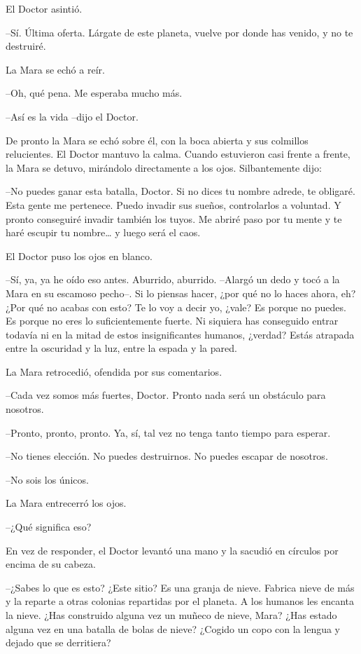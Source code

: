 El Doctor asintió.

--Sí. Última oferta. Lárgate de este planeta, vuelve por donde has venido, y no te destruiré.

La Mara se echó a reír.

--Oh, qué pena. Me esperaba mucho más.

--Así es la vida --dijo el Doctor.

De pronto la Mara se echó sobre él, con la boca abierta y sus colmillos relucientes. El Doctor mantuvo la calma. Cuando estuvieron casi frente a frente, la Mara se detuvo, mirándolo directamente a los ojos. Silbantemente dijo:

--No puedes ganar esta batalla, Doctor. Si no dices tu nombre adrede, te obligaré. Esta gente me pertenece. Puedo invadir sus sueños, controlarlos a voluntad. Y pronto conseguiré invadir también los tuyos. Me abriré paso por tu mente y te haré escupir tu nombre… y luego será el caos.

El Doctor puso los ojos en blanco.

--Sí, ya, ya he oído eso antes. Aburrido, aburrido. --Alargó un dedo y tocó a la Mara en su escamoso pecho--. Si lo piensas hacer, ¿por qué no lo haces ahora, eh? ¿Por qué no acabas con esto? Te lo voy a decir yo, ¿vale? Es porque no puedes. Es porque no eres lo suficientemente fuerte. Ni siquiera has conseguido entrar todavía ni en la mitad de estos insignificantes humanos, ¿verdad? Estás atrapada entre la oscuridad y la luz, entre la espada y la pared.

La Mara retrocedió, ofendida por sus comentarios.

--Cada vez somos más fuertes, Doctor. Pronto nada será un obstáculo para nosotros.

--Pronto, pronto, pronto. Ya, sí, tal vez no tenga tanto tiempo para esperar.

--No tienes elección. No puedes destruirnos. No puedes escapar de nosotros.

--No sois los únicos.

La Mara entrecerró los ojos.

--¿Qué significa eso?

En vez de responder, el Doctor levantó una mano y la sacudió en círculos por encima de su cabeza.

--¿Sabes lo que es esto? ¿Este sitio? Es una granja de nieve. Fabrica nieve de más y la reparte a otras colonias repartidas por el planeta. A los humanos les encanta la nieve. ¿Has construido alguna vez un muñeco de nieve, Mara? ¿Has estado alguna vez en una batalla de bolas de nieve? ¿Cogido un copo con la lengua y dejado que se derritiera?

